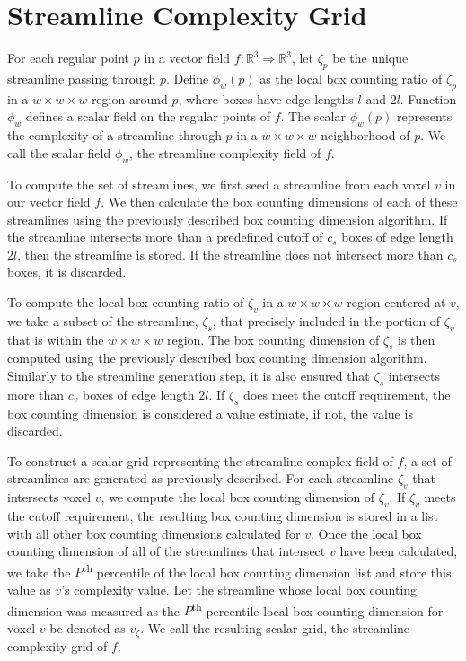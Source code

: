 \documentclass{egpubl}
\newcommand {\emath}[1]  {\ensuremath{#1}}
\newcommand {\Real}[1]   {\emath{\mathbb{R}^{#1}}}   %
\newcommand {\Rthree}    {\Real{3}}                  %
\newcommand {\gDim}[1]   {\emath{#1 \times #1 \times #1}} %
\begin{document}
\section{Streamline Complexity Grid} \label{sec:scg}

For each regular point $p$ in a vector field $f: \Rthree \Rightarrow \Rthree$,
let $\zeta_p$ be the unique streamline passing through $p$.
Define $\phi_w(p)$ as the local box counting ratio of $\zeta_p$
in a $\gDim{w}$ region around $p$,
where boxes have edge lengths $l$ and $2l$.
Function $\phi_w$ defines a scalar field on the regular points of $f$.
The scalar $\phi_w(p)$ represents the complexity of a streamline through $p$ in a $\gDim{w}$ neighborhood of $p$.
We call the scalar field $\phi_w$, the streamline complexity field of $f$.

To compute the set of streamlines, we first seed a streamline from each voxel $v$ in our vector field $f$.
We then calculate the box counting dimensions of each of these streamlines using the previously described box counting dimension algorithm.
If the streamline intersects more than a predefined cutoff of $c_s$ boxes of edge length $2l$, then the streamline is stored.
If the streamline does not intersect more than $c_s$ boxes, it is discarded.

To compute the local box counting ratio of $\zeta_v$ in a $\gDim{w}$ region centered at $v$, we take a subset of the streamline, $\zeta_s$, that precisely included in the portion of $\zeta_v$ that is within the $\gDim{w}$ region.
The box counting dimension of $\zeta_s$ is then computed using the previously described box counting dimension algorithm.
Similarly to the streamline generation step, it is also ensured that $\zeta_s$ intersects more than $c_v$ boxes of edge length $2l$.
If $\zeta_s$ does meet the cutoff requirement, the box counting dimension is considered a value estimate, if not, the value is discarded.

To construct a scalar grid representing the streamline complex field of $f$, a set of streamlines are generated as previously described.
For each streamline $\zeta_v$ that intersects voxel $v$, we compute the local box counting dimension of $\zeta_v$.
If $\zeta_v$ meets the cutoff requirement, the resulting box counting dimension is stored in a list with all other box counting dimensions calculated for $v$.
Once the local box counting dimension of all of the streamlines that intersect $v$ have been calculated, we take the $P$\textsuperscript{th} percentile of the local box counting dimension list and store this value as $v$'s complexity value.
Let the streamline whose local box counting dimension was measured as the $P$\textsuperscript{th} percentile local box counting dimension for voxel $v$ be denoted as $v_\zeta$.
We call the resulting scalar grid, the streamline complexity grid of $f$.
\end{document}
